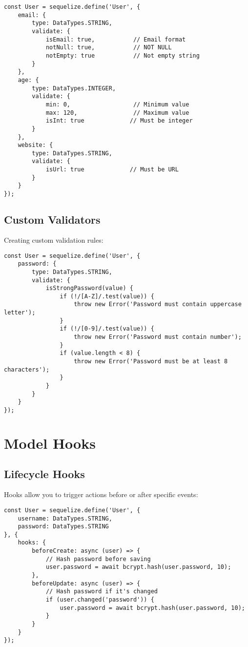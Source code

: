 \documentclass[12pt,a4paper]{book}
\begin{document}
	\begin{verbatim}
const User = sequelize.define('User', {
	email: {
		type: DataTypes.STRING,
		validate: {
			isEmail: true,           // Email format
			notNull: true,           // NOT NULL
			notEmpty: true           // Not empty string
		}
	},
	age: {
		type: DataTypes.INTEGER,
		validate: {
			min: 0,                  // Minimum value
			max: 120,                // Maximum value
			isInt: true             // Must be integer
		}
	},
	website: {
		type: DataTypes.STRING,
		validate: {
			isUrl: true             // Must be URL
		}
	}
});
	\end{verbatim}
	
	\subsection{Custom Validators}
	Creating custom validation rules:
	
	\begin{verbatim}
const User = sequelize.define('User', {
	password: {
		type: DataTypes.STRING,
		validate: {
			isStrongPassword(value) {
				if (!/[A-Z]/.test(value)) {
					throw new Error('Password must contain uppercase letter');
				}
				if (!/[0-9]/.test(value)) {
					throw new Error('Password must contain number');
				}
				if (value.length < 8) {
					throw new Error('Password must be at least 8 characters');
				}
			}
		}
	}
});
	\end{verbatim}
	
	\section{Model Hooks}
	
	\subsection{Lifecycle Hooks}
	Hooks allow you to trigger actions before or after specific events:
	
	\begin{verbatim}
const User = sequelize.define('User', {
	username: DataTypes.STRING,
	password: DataTypes.STRING
}, {
	hooks: {
		beforeCreate: async (user) => {
			// Hash password before saving
			user.password = await bcrypt.hash(user.password, 10);
		},
		beforeUpdate: async (user) => {
			// Hash password if it's changed
			if (user.changed('password')) {
				user.password = await bcrypt.hash(user.password, 10);
			}
		}
	}
});
	\end{verbatim}
	
\end{document}
